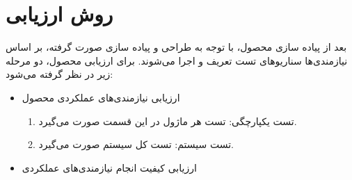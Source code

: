 \chapter{روش ارزیابی }

بعد از پیاده سازی محصول، با توجه به طراحی و پیاده سازی صورت گرفته، بر اساس نیازمندی‌ها سناریوهای تست تعریف و اجرا می‌شوند. برای ارزیابی محصول، دو مرحله زیر در نظر گرفته می‌شود:


\begin{itemize}
    \item ارزیابی نیازمندی‌های عملکردی محصول
    \begin{enumerate}
        \item تست یکپارچگی: تست هر ماژول در این قسمت صورت می‌گیرد.
        \item تست سیستم: تست کل سیستم صورت می‌گیرد.
    \end{enumerate}
    
    
    \item ارزیابی کیفیت انجام نیازمندی‌های عملکردی
\end{itemize}

